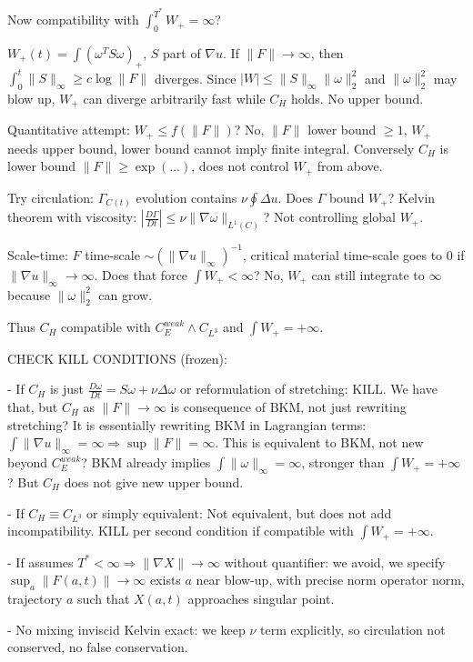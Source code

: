 \documentclass[11pt]{article}
\begin{document}
Now compatibility with $\int_0^{T^*}W_+=\infty$?

$W_+(t)=\int(\omega^TS\omega)_+$, $S$ part of $\nabla u$. If $\|F\|\to\infty$, then $\int_0^t\|S\|_\infty\ge c\log\|F\|$ diverges. Since $|W|\le\|S\|_\infty\|\omega\|_2^2$ and $\|\omega\|_2^2$ may blow up, $W_+$ can diverge arbitrarily fast while $C_H$ holds. No upper bound.

Quantitative attempt: $W_+\le f(\|F\|)$? No, $\|F\|$ lower bound $\ge1$, $W_+$ needs upper bound, lower bound cannot imply finite integral. Conversely $C_H$ is lower bound $\|F\|\ge\exp(\dots)$, does not control $W_+$ from above.

Try circulation: $\Gamma_{C(t)}$ evolution contains $\nu\oint\Delta u$. Does $\Gamma$ bound $W_+$? Kelvin theorem with viscosity: $|\frac{D\Gamma}{Dt}|\le\nu\|\nabla\omega\|_{L^1(C)}$? Not controlling global $W_+$.

Scale-time: $F$ time-scale $\sim(\|\nabla u\|_\infty)^{-1}$, critical material time-scale goes to 0 if $\|\nabla u\|_\infty\to\infty$. Does that force $\int W_+<\infty$? No, $W_+$ can still integrate to $\infty$ because $\|\omega\|_2^2$ can grow.

Thus $C_H$ compatible with $C_E^{weak}\land C_{L^3}$ and $\int W_+=+\infty$.

CHECK KILL CONDITIONS (frozen):

- If $C_H$ is just $\frac{D\omega}{Dt}=S\omega+\nu\Delta\omega$ or reformulation of stretching: KILL. We have that, but $C_H$ as $\|F\|\to\infty$ is consequence of BKM, not just rewriting stretching? It is essentially rewriting BKM in Lagrangian terms: $\int\|\nabla u\|_\infty=\infty\Rightarrow\sup\|F\|=\infty$. This is equivalent to BKM, not new beyond $C_E^{weak}$? BKM already implies $\int\|\omega\|_\infty=\infty$, stronger than $\int W_+=+\infty$? But $C_H$ does not give new upper bound.

- If $C_H\equiv C_{L^3}$ or simply equivalent: Not equivalent, but does not add incompatibility. KILL per second condition if compatible with $\int W_+=+\infty$.

- If assumes $T^*<\infty\Rightarrow\|\nabla X\|\to\infty$ without quantifier: we avoid, we specify $\sup_a\|F(a,t)\|\to\infty$ exists $a$ near blow-up, with precise norm operator norm, trajectory $a$ such that $X(a,t)$ approaches singular point.

- No mixing inviscid Kelvin exact: we keep $\nu$ term explicitly, so circulation not conserved, no false conservation.
\end{document}
